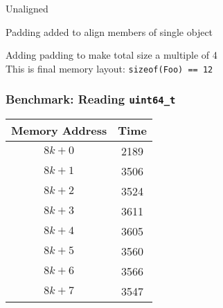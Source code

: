 \begin{frame}
\begin{overprint}
\begin{center}
    \end{center}
  \end{overprint}
  \begin{overprint}
    \begin{center}
      Unaligned
    \end{center}

    \begin{center}
      Padding added to align members of single object
    \end{center}

    \begin{center}
      Adding padding to make total size a multiple of 4 \\
      This is final memory layout: \texttt{sizeof(Foo) == 12} 
    \end{center}
  \end{overprint}
\end{frame}

\begin{frame}
  \frametitle{Benchmark: Reading \texttt{uint64\_t}}
  \begin{center}
    \begin{tabular}{cc}
      \textbf{Memory Address} & \textbf{Time} \\
      \toprule
      $8k+0$ & 2189 \\
      $8k+1$ & 3506 \\
      $8k+2$ & 3524 \\
      $8k+3$ & 3611 \\
      $8k+4$ & 3605 \\
      $8k+5$ & 3560 \\
      $8k+6$ & 3566 \\
      $8k+7$ & 3547 \\
    \end{tabular}
  \end{center}
\end{frame}


